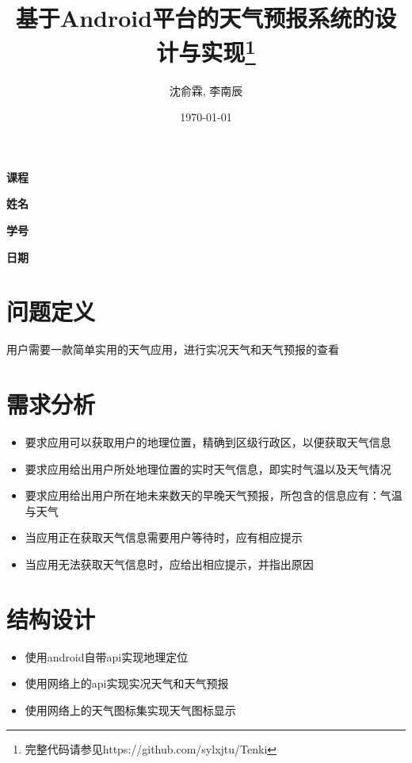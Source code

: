 \documentclass[UTF8]{ctexart}
\title{基于Android平台的天气预报系统的设计与实现\footnote{完整代码请参见https://github.com/sylxjtu/Tenki}}
\date{\today}
\author{沈俞霖, 李南辰}
\begin{document}
  \maketitle
  \vspace{80mm}
  \begin{flushright}

  \textbf{课程} 

  \textbf{姓名} 


  \textbf{学号} 


  \textbf{日期} \makebox[7em][l]{\today}

  \end{flushright}
  \newpage

  \tableofcontents
  \newpage

  \section{问题定义}
    用户需要一款简单实用的天气应用，进行实况天气和天气预报的查看
  \section{需求分析}
    \begin{itemize}
      \item 要求应用可以获取用户的地理位置，精确到区级行政区，以便获取天气信息
      \item 要求应用给出用户所处地理位置的实时天气信息，即实时气温以及天气情况
      \item 要求应用给出用户所在地未来数天的早晚天气预报，所包含的信息应有：气温与天气
      \item 当应用正在获取天气信息需要用户等待时，应有相应提示
      \item 当应用无法获取天气信息时，应给出相应提示，并指出原因
    \end{itemize}
  \section{结构设计}
    \begin{itemize}
      \item 使用android自带api实现地理定位
      \item 使用网络上的api实现实况天气和天气预报
      \item 使用网络上的天气图标集实现天气图标显示
    \end{itemize}
\end{document}
